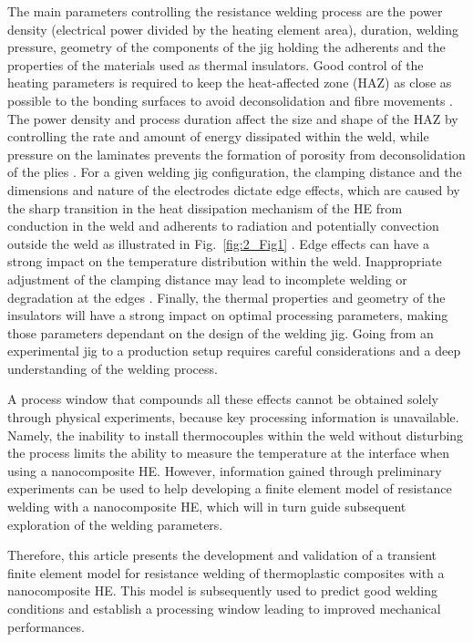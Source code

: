 The main parameters controlling the resistance welding process are the power density (electrical power divided by the heating element area), duration, welding pressure, geometry of the components of the jig holding the adherents and the properties of the materials used as thermal insulators. 
Good control of the heating parameters is required to keep the heat-affected zone (HAZ) as close as possible to the bonding surfaces to avoid deconsolidation and fibre movements \cite{Stavrov2005a}. 
The power density and process duration affect the size and shape of the HAZ by controlling the rate and amount of energy dissipated within the weld, while pressure on the laminates prevents the formation of porosity from deconsolidation of the plies \cite{Shi2017}. 
For a given welding jig configuration, the clamping distance and the dimensions and nature of the electrodes dictate edge effects, which are caused by the sharp transition in the heat dissipation mechanism of the HE from conduction in the weld and adherents to radiation and potentially convection outside the weld as illustrated in Fig.~\ref{fig:2_Fig1} \cite{Ageorges2001b}. 
Edge effects can have a strong impact on the temperature distribution within the weld. 
Inappropriate adjustment of the clamping distance may lead to incomplete welding or degradation at the edges \cite{Talbot2013}. 
Finally, the thermal properties and geometry of the insulators will have a strong impact on optimal processing parameters, making those parameters dependant on the design of the welding jig. 
Going from an experimental jig to a production setup requires careful considerations and a deep understanding of the welding process. 

A process window that compounds all these effects cannot be obtained solely through physical experiments, because key processing information is unavailable. 
Namely, the inability to install thermocouples within the weld without disturbing the process limits the ability to measure the temperature at the interface when using a nanocomposite HE. 
However, information gained through preliminary experiments can be used to help developing a finite element model of resistance welding with a nanocomposite HE, which will in turn guide subsequent exploration of the welding parameters. 

Therefore, this article presents the development and validation of a transient finite element model for resistance welding of thermoplastic composites with a nanocomposite HE. 
This model is subsequently used to predict good welding conditions and establish a processing window leading to improved mechanical performances. 

